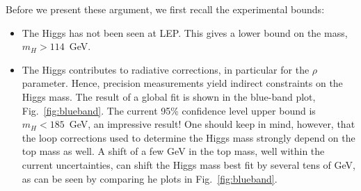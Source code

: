 \documentclass[12pt]{report}
\newcommand{\2}{\ensuremath{\sqrt{2}\,}}
\begin{document}
{      Before we present these argument, we first recall the experimental bounds:
      \begin{itemize}
        \item The Higgs has not been seen at LEP. This gives a lower bound on the mass,
          $m_H>114$~GeV.
        \item The Higgs contributes to radiative corrections, in particular for the $\rho$
          parameter. Hence, precision measurements yield indirect constraints
          on the Higgs mass. The result of a global fit is shown in the blue-band plot,
          Fig.~\ref{fig:blueband}. The current 95\% confidence level upper bound is 
          $m_H<185$~GeV, an impressive result! One should keep in mind, however, that the loop
          corrections used to determine the Higgs mass strongly depend on the top mass as well. A
          shift of a few GeV in the top mass, well within the current uncertainties, can shift the
          Higgs mass best fit by several tens of GeV, as can be seen by comparing he plots in
          Fig.~\ref{fig:blueband}. 
      \end{itemize}

}
\end{document}
